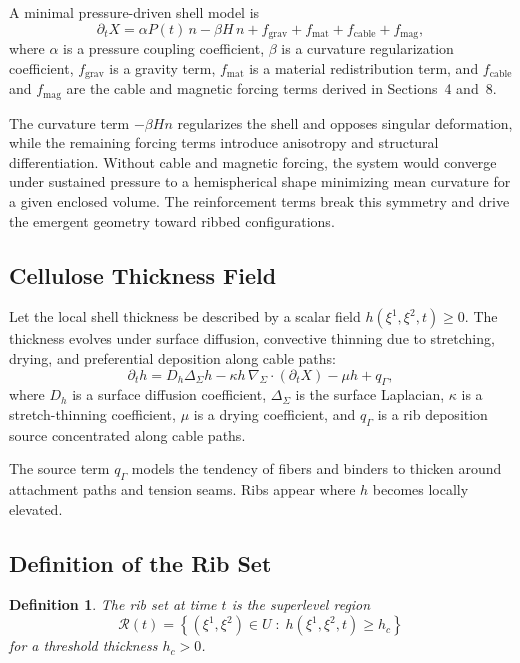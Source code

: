 \documentclass[12pt,a4paper]{article}
\newtheorem{definition}{Definition}
\begin{document}
A minimal pressure-driven shell model is
\begin{equation}
\partial_t X
= \alpha P(t)\,n
- \beta H\,n
+ f_{\mathrm{grav}}
+ f_{\mathrm{mat}}
+ f_{\mathrm{cable}}
+ f_{\mathrm{mag}},
\end{equation}
where $\alpha$ is a pressure coupling coefficient, $\beta$ is a
curvature regularization coefficient, $f_{\mathrm{grav}}$ is a gravity
term, $f_{\mathrm{mat}}$ is a material redistribution term, and
$f_{\mathrm{cable}}$ and $f_{\mathrm{mag}}$ are the cable and magnetic
forcing terms derived in Sections~4 and~8.

The curvature term $-\beta H n$ regularizes the shell and opposes
singular deformation, while the remaining forcing terms introduce
anisotropy and structural differentiation. Without cable and magnetic
forcing, the system would converge under sustained pressure to a
hemispherical shape minimizing mean curvature for a given enclosed
volume. The reinforcement terms break this symmetry and drive the
emergent geometry toward ribbed configurations.

\subsection{Cellulose Thickness Field}

Let the local shell thickness be described by a scalar field
$h(\xi^1,\xi^2,t) \geq 0$. The thickness evolves under surface
diffusion, convective thinning due to stretching, drying, and
preferential deposition along cable paths:
\begin{equation}
\partial_t h
= D_h \Delta_\Sigma h
- \kappa h\,\nabla_\Sigma \cdot (\partial_t X)
- \mu h
+ q_\Gamma,
\end{equation}
where $D_h$ is a surface diffusion coefficient, $\Delta_\Sigma$ is the
surface Laplacian, $\kappa$ is a stretch-thinning coefficient, $\mu$
is a drying coefficient, and $q_\Gamma$ is a rib deposition source
concentrated along cable paths.

The source term $q_\Gamma$ models the tendency of fibers and binders
to thicken around attachment paths and tension seams. Ribs appear where
$h$ becomes locally elevated.

\subsection{Definition of the Rib Set}

\begin{definition}
The rib set at time $t$ is the superlevel region
\begin{equation}
\mathcal{R}(t)
= \left\{
(\xi^1,\xi^2) \in U
\;:\;
h(\xi^1,\xi^2,t) \geq h_c
\right\}
\end{equation}
for a threshold thickness $h_c > 0$.
\end{definition}
\end{document}

